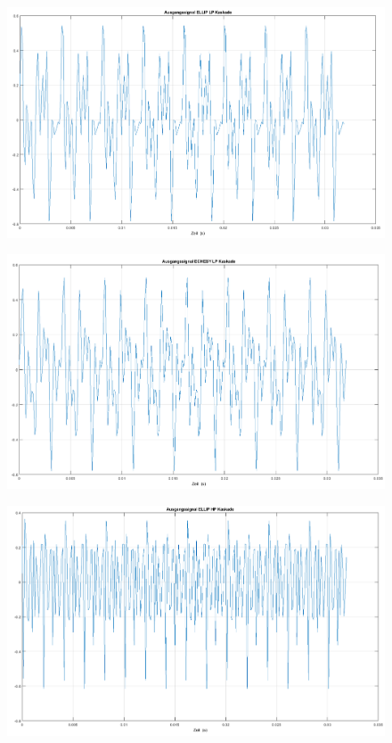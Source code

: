 \begin{figure}
\centering
\includegraphics[width=0.7\linewidth]{Bilder/Attachment_D_Ausgangssignal_ellip_lp}
\caption{}
\label{fig:Attachment_D_Ausgangssignal_ellip_lp}
\end{figure}

\begin{figure}
\centering
\includegraphics[width=0.7\linewidth]{Bilder/Attachment_D_Ausgangssignal_cheby_lp}
\caption{}
\label{fig:Attachment_D_Ausgangssignal_cheby_lp}
\end{figure}

\begin{figure}
\centering
\includegraphics[width=0.7\linewidth]{Bilder/Attachment_D_Ausgangssignal_ellip_hp}
\caption{}
\label{fig:Attachment_D_Ausgangssignal_ellip_hp}
\end{figure}




